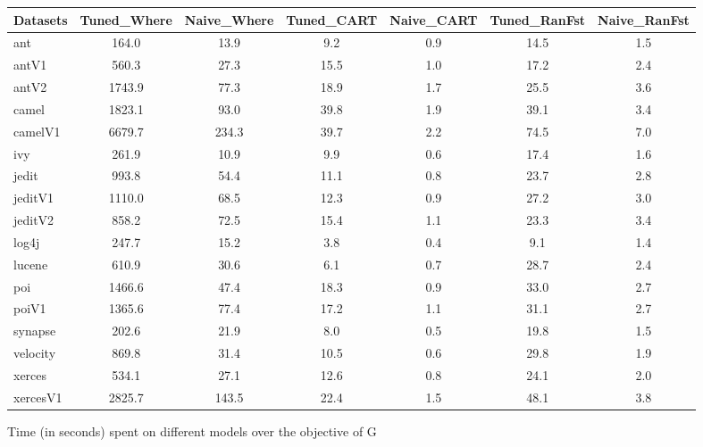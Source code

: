 \documentclass{sig-alternative}
\def\baselinestretch{1}
\begin{document}
\begin{figure}[!ht]

\renewcommand{\baselinestretch}{0.7}
\scriptsize
\centering
  \begin{tabular}{l|c |c |c |c |c |c }
    \hline\hline
    Datasets & Tuned\_Where & Naive\_Where & Tuned\_CART & Naive\_CART & Tuned\_RanFst & Naive\_RanFst\\
    \hline
    ant & 164.0 & 13.9 & 9.2 & 0.9 & 14.5 & 1.5\\
    antV1 & 560.3 & 27.3 & 15.5 & 1.0 & 17.2 & 2.4\\
    antV2 & 1743.9 & 77.3 & 18.9 & 1.7 & 25.5 & 3.6\\
    camel & 1823.1 & 93.0 & 39.8 & 1.9 & 39.1 & 3.4\\
    camelV1 & 6679.7 & 234.3 & 39.7 & 2.2 & 74.5 & 7.0\\
    ivy & 261.9 & 10.9 & 9.9 & 0.6 & 17.4 & 1.6\\
    jedit & 993.8 & 54.4 & 11.1 & 0.8 & 23.7 & 2.8\\
    jeditV1 & 1110.0 & 68.5 & 12.3 & 0.9 & 27.2 & 3.0\\
    jeditV2 & 858.2 & 72.5 & 15.4 & 1.1 & 23.3 & 3.4\\
    log4j & 247.7 & 15.2 & 3.8 & 0.4 & 9.1 & 1.4\\
    lucene & 610.9 & 30.6 & 6.1 & 0.7 & 28.7 & 2.4\\
    poi & 1466.6 & 47.4 & 18.3 & 0.9 & 33.0 & 2.7\\
    poiV1 & 1365.6 & 77.4 & 17.2 & 1.1 & 31.1 & 2.7\\
    synapse & 202.6 & 21.9 & 8.0 & 0.5 & 19.8 & 1.5\\
    velocity & 869.8 & 31.4 & 10.5 & 0.6 & 29.8 & 1.9\\
    xerces & 534.1 & 27.1 & 12.6 & 0.8 & 24.1 & 2.0\\
    xercesV1 & 2825.7 & 143.5 & 22.4 & 1.5 & 48.1 & 3.8\\
  \end{tabular}
  \caption{Time (in seconds) spent on different models over the objective of G}
\end{figure}
\end{document}
